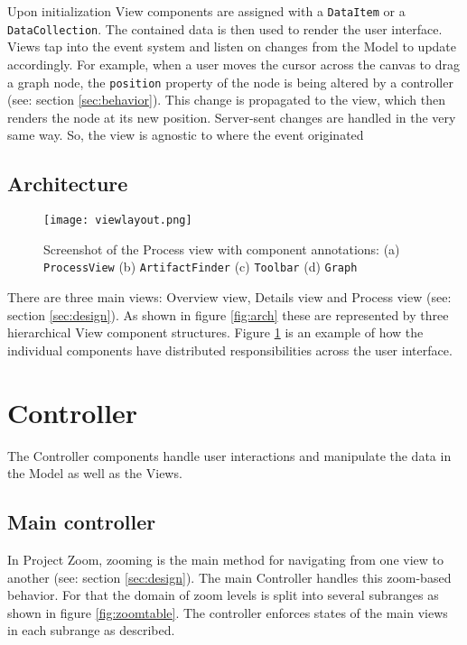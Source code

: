 Upon initialization View components are assigned with a \texttt{DataItem} or a \texttt{DataCollection}. The contained data is then used to render the user interface. Views tap into the event system and listen on changes from the Model to update accordingly. For example, when a user moves the cursor across the canvas to drag a graph node, the \texttt{position} property of the node is being altered by a controller (see: section \ref{sec:behavior}). This change is propagated to the view, which then renders the node at its new position. Server-sent changes are handled in the very same way. So, the view is agnostic to where the event originated

\subsection{Architecture}

\begin{figure}
\texttt{[image: viewlayout.png]}
\caption[Screenshot of the Process view with component annotations]{Screenshot of the Process view with component annotations: (a) \texttt{ProcessView} \quad (b) \texttt{ArtifactFinder} \quad (c) \texttt{Toolbar} \quad (d) \texttt{Graph}}
\label{fig:viewlayout}
\end{figure}

There are three main views: Overview view, Details view and Process view (see: section \ref{sec:design}). As shown in figure \ref{fig:arch} these are represented by three hierarchical View component structures. Figure \ref{fig:viewlayout} is an example of how the individual components have distributed responsibilities across the user interface.

\section{Controller}

The Controller components handle user interactions and manipulate the data in the Model as well as the Views.

\subsection{Main controller}
In Project Zoom, zooming is the main method for navigating from one view to another (see: section \ref{sec:design}). The main Controller handles this zoom-based behavior. For that the domain of zoom levels is split into several subranges as shown in figure \ref{fig:zoomtable}. The controller enforces states of the main views in each subrange as described.

